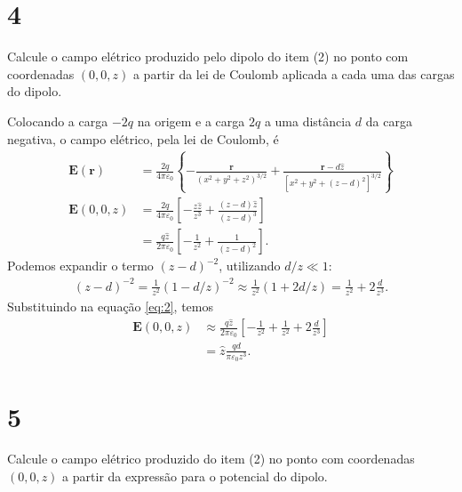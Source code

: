 \documentclass[11pt]{article}
\begin{document}
\section{4}
\label{sec:orga9aa4f9}
Calcule o campo elétrico produzido pelo dipolo do item (2) no ponto com
coordenadas \((0,0,z)\) a partir da lei de Coulomb aplicada a cada uma das
cargas do dipolo.

Colocando a carga \(-2q\) na origem e a carga \(2q\) a uma distância \(d\) da
carga negativa, o campo elétrico, pela lei de Coulomb, é
\begin{align}
  \mathbf E(\mathbf r) &= \frac{2q}{4\pi\varepsilon_0}\left\{-\frac{\mathbf r}
                         {(x^2+y^2+z^2)^{3/2}}
                         +\frac{\mathbf r - d\hat z}
                         {[x^2+y^2+(z-d)^2]^{3/2}}\right\}\\
  \mathbf E(0,0,z) &= \frac{2q}{4\pi\varepsilon_0}\left[
                     -\frac{z\hat z}{z^3}+\frac{(z-d)\hat z}{(z-d)^3}
                     \right]\\
                       &= \frac{q\hat z}{2\pi\varepsilon_0}\left[
                         -\frac{1}{z^2}+\frac{1}{(z-d)^2}
                         \right].\label{eq:2}
\end{align}
Podemos expandir o termo \((z-d)^{-2}\), utilizando \(d/z\ll 1\):
\begin{align}
  (z-d)^{-2} = \frac {1}{z^2}(1-d/z)^{-2} \approx \frac{1}{z^2}(1+2 d/z) = \frac 1{z^2}+2\frac d{z^3}.
\end{align}
Substituindo na equação \ref{eq:2}, temos
\begin{align}
  \mathbf E(0,0,z) &\approx \frac{q\hat z}{2\pi\varepsilon_0}\left[
                         -\frac{1}{z^2}+\frac{1}{z^2}
                         +2\frac d{z^3}
                         \right]\\
                   &= \hat z\frac{qd}{\pi\varepsilon_0z^3}.\label{eq:5}
\end{align}

\section{5}
\label{sec:org763e9c4}
Calcule o campo elétrico produzido do item (2) no ponto com coordenadas
\((0,0,z)\) a partir da expressão para o potencial do dipolo.
\end{document}
